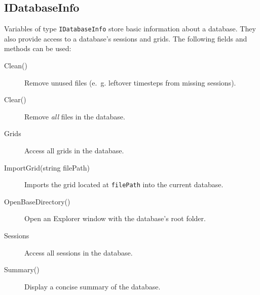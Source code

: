 \subsection{IDatabaseInfo}
Variables of type \lstinline{IDatabaseInfo} store basic information about a database. They also provide access to a database's sessions and grids.
The following fields and methods can be used:
\begin{description}
	\item[Clean()]
	Remove unused files (e.~g. leftover timesteps from missing sessions).
	
	\item[Clear()]
	Remove \emph{all} files in the database.
	
	\item[Grids]
	Access all grids in the database.
	
	\item[ImportGrid(string filePath)]
	Imports the grid located at \lstinline{filePath} into the current database.
	
	\item[OpenBaseDirectory()]
	Open an Explorer window with the database's root folder.
	
	\item[Sessions]
	Access all sessions in the database.
	
	\item[Summary()]
	Display a concise summary of the database.
\end{description}

